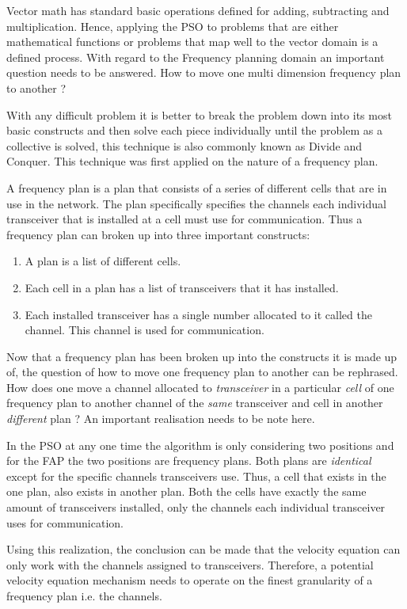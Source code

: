 Vector math has standard basic operations defined for adding, subtracting and multiplication. Hence, applying the PSO to problems that are either mathematical functions or problems that map well to the vector domain is a defined process. With regard to the Frequency planning domain an important question needs to be answered. How to move one multi dimension frequency plan to another ?

With any difficult problem it is better to break the problem down into its most basic constructs and then solve each piece individually until the problem as a collective is solved, this technique is also commonly known as Divide and Conquer. This technique was first applied on the nature of a frequency plan.

A frequency plan is a plan that consists of a series of different cells that are in use in the network. The plan specifically specifies the channels each individual transceiver that is installed at a cell must use for communication. Thus a frequency plan can broken up into three important constructs:
\begin{enumerate}
\item A plan is a list of different cells.
\item Each cell in a plan has a list of transceivers that it has installed.
\item Each installed transceiver has a single number allocated to it called the channel. This channel is used for communication.
\end{enumerate}

Now that a frequency plan has been broken up into the constructs it is made up of, the question of how to move one frequency plan to another can be rephrased. How does one move a channel allocated to \emph{transceiver} in a particular \emph{cell} of one frequency plan to another channel of the \emph{same} transceiver and cell in another \emph{different} plan ? An important realisation needs to be note here.

In the PSO at any one time the algorithm is only considering two positions and for the FAP the two positions are frequency plans. Both plans are \emph{identical} except for the specific channels transceivers use. Thus, a cell that exists in the one plan, also exists in another plan. Both the cells have exactly the same amount of transceivers installed, only the channels each individual transceiver uses for communication.

Using this realization, the conclusion can be made that the velocity equation can only work with the channels assigned to transceivers. Therefore, a potential velocity equation mechanism needs to operate on the finest granularity of a frequency plan i.e. the channels.

